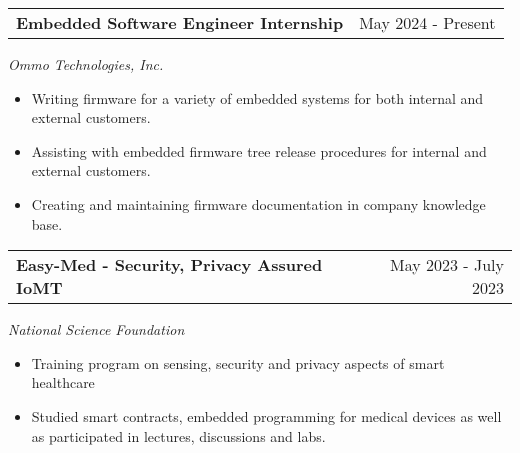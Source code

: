\documentclass[a4paper,12pt]{article}
\begin{document}
\begin{tabularx}{\linewidth}{@{}Xr@{}}
\textbf{Embedded Software Engineer Internship} & \hfill May 2024 - Present
\end{tabularx}
\textit{Ommo Technologies, Inc.}
\begin{itemize}[leftmargin=*, nosep]
    \item Writing firmware for a variety of embedded systems for both internal and external customers.
    \item Assisting with embedded firmware tree release procedures for internal and external customers.
    \item Creating and maintaining firmware documentation in company knowledge base.
\end{itemize}

\begin{tabularx}{\linewidth}{@{}Xr@{}}
\textbf{Easy-Med - Security, Privacy Assured IoMT} & \hfill May 2023 - July 2023
\end{tabularx}
\textit{National Science Foundation}
\begin{itemize}[leftmargin=*, nosep]
    \item Training program on sensing, security and privacy aspects of smart healthcare
    \item Studied smart contracts, embedded programming for medical devices as well as participated in lectures, discussions and labs.
\end{itemize}

\vfill
\end{document}
